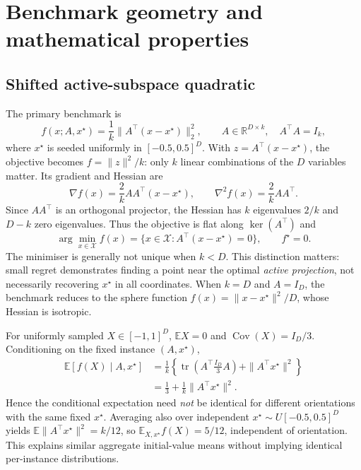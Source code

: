 \documentclass[11pt,a4paper]{article}
\newcommand{\R}{\mathbb{R}}
\newcommand{\E}{\mathbb{E}}
\begin{document}
\section{Benchmark geometry and mathematical properties}
\subsection{Shifted active-subspace quadratic}
The primary benchmark is
\begin{equation}\label{eq:quad}
f(x;A,x^\star)=\frac{1}{k}\|A^\top(x-x^\star)\|_2^2,\qquad A\in\R^{D\times k},\quad A^\top A=I_k,
\end{equation}
where $x^\star$ is seeded uniformly in $[-0.5,0.5]^D$. With $z=A^\top(x-x^\star)$, the objective becomes $f=\|z\|^2/k$: only $k$ linear combinations of the $D$ variables matter. Its gradient and Hessian are
\begin{equation}\nabla f(x)=\frac{2}{k}AA^\top(x-x^\star),\qquad \nabla^2 f(x)=\frac{2}{k}AA^\top.\end{equation}
Since $AA^\top$ is an orthogonal projector, the Hessian has $k$ eigenvalues $2/k$ and $D-k$ zero eigenvalues. Thus the objective is flat along $\ker(A^\top)$ and
\begin{equation}\arg\min_{x\in\mathcal X} f(x)=\{x\in\mathcal X:A^\top(x-x^\star)=0\},\qquad f^\star=0.\end{equation}
The minimiser is generally not unique when $k<D$. This distinction matters: small regret demonstrates finding a point near the optimal \emph{active projection}, not necessarily recovering $x^\star$ in all coordinates. When $k=D$ and $A=I_D$, the benchmark reduces to the sphere function $f(x)=\|x-x^\star\|^2/D$, whose Hessian is isotropic. %

For uniformly sampled $X\in[-1,1]^D$, $\E X=0$ and $\operatorname{Cov}(X)=I_D/3$. Conditioning on the fixed instance $(A,x^\star)$,
\begin{align}
\E[f(X)\mid A,x^\star]&=\frac1k\left\{\operatorname{tr}\left(A^\top\frac{I_D}{3}A\right)+\|A^\top x^\star\|^2\right\}\\
&=\frac13+\frac1k\|A^\top x^\star\|^2.\label{eq:initial}
\end{align}
Hence the conditional expectation need \emph{not} be identical for different orientations with the same fixed $x^\star$. Averaging also over independent $x^\star\sim U[-0.5,0.5]^D$ yields $\E\|A^\top x^\star\|^2=k/12$, so $\E_{X,x^\star}f(X)=5/12$, independent of orientation. This explains similar aggregate initial-value means without implying identical per-instance distributions.
\end{document}
